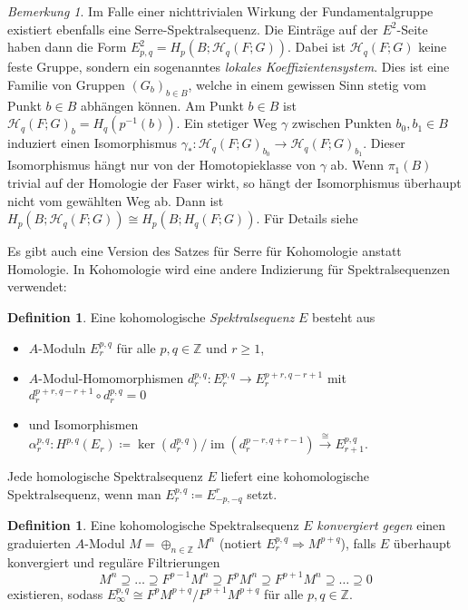 \documentclass[11pt, a4paper, german]{article}
\theoremstyle{definition}
\newtheorem{defn}[lem]{Definition}
\theoremstyle{remark}
\newtheorem*{bem}{Bemerkung}
\newcommand{\Z}{\mathbb{Z}} %
\DeclareMathOperator{\im}{im} %
\newcommand{\LH}{\mathcal{H}} %
\begin{document}
\begin{bem}
  Im Falle einer nichttrivialen Wirkung der Fundamentalgruppe existiert ebenfalls eine Serre-Spektralsequenz.
  Die Einträge auf der $E^2$-Seite haben dann die Form $E^2_{p,q} = H_p(B; \LH_q(F; G))$.
  Dabei ist $\LH_q(F; G)$ keine feste Gruppe, sondern ein sogenanntes \emph{lokales Koeffizientensystem}.
  Dies ist eine Familie von Gruppen $(G_b)_{b \in B}$, welche in einem gewissen Sinn stetig vom Punkt $b \in B$ abhängen können.
  Am Punkt $b \in B$ ist $\LH_q(F; G)_b = H_q(p^{-1}(b))$.
  Ein stetiger Weg $\gamma$ zwischen Punkten $b_0, b_1 \in B$ induziert einen Isomorphismus $\gamma_* : \LH_q(F; G)_{b_0} \to \LH_q(F; G)_{b_1}$.
  Dieser Isomorphismus hängt nur von der Homotopieklasse von $\gamma$ ab.
  Wenn $\pi_1(B)$ trivial auf der Homologie der Faser wirkt, so hängt der Isomorphismus überhaupt nicht vom gewählten Weg ab.
  Dann ist $H_p(B; \LH_q(F; G)) \cong H_p(B; H_q(F; G))$.
  Für Details siehe \cite[133--185]{mccleary:ss}
\end{bem}

Es gibt auch eine Version des Satzes für Serre für Kohomologie anstatt Homologie.
In Kohomologie wird eine andere Indizierung für Spektralsequenzen verwendet:

\begin{defn}
  Eine kohomologische \emph{Spektralsequenz} $E$ besteht aus
  \begin{itemize}
    \item $A$-Moduln $E_r^{p,q}$ für alle $p, q \in \Z$ und $r \geq 1$,
    \item $A$-Modul-Homomorphismen $d_r^{p,q} : E_r^{p,q} \to E_r^{p+r,q-r+1}$ mit $d_r^{p+r,q-r+1} \circ d_r^{p,q} = 0$
    \item und Isomorphismen $\alpha_r^{p,q} : H^{p,q}(E_r) \!\coloneqq\! \ker(d_r^{p,q}) / \im(d_r^{p-r,q+r-1}) \xrightarrow{\cong} E_{r+1}^{p,q}$.
  \end{itemize}
\end{defn}

Jede homologische Spektralsequenz $E$ liefert eine kohomologische Spektralsequenz, wenn man $E_r^{p,q} \coloneqq E^r_{-p,-q}$ setzt.

\begin{defn}
  Eine kohomologische Spektralsequenz $E$ \emph{konvergiert gegen} einen graduierten $A$-Modul $M = \oplus_{n \in \Z} M^n$ (notiert $E_r^{p,q} \Rightarrow M^{p+q}$), falls $E$ überhaupt konvergiert und reguläre Filtrierungen
  \[ M^n \supseteq \ldots \supseteq F^{p-1} M^n \supseteq F^p M^n \supseteq F^{p+1} M^n \supseteq \ldots \supseteq 0 \]
  existieren, sodass $E_\infty^{p,q} \cong F^p M^{p+q} / F^{p+1} M^{p+q}$ für alle $p, q \in \Z$.
\end{defn}
\end{document}
